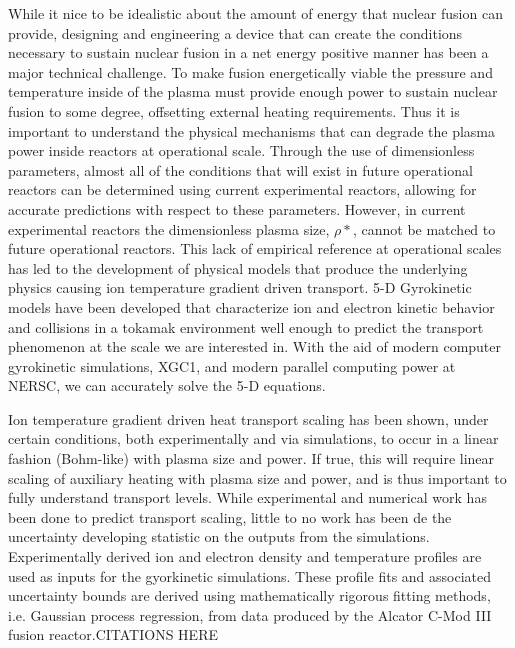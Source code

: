 \documentclass{article}
\begin{document}
While it nice to be idealistic about the amount of energy that nuclear fusion can provide, designing and engineering a device that can create the conditions necessary to sustain nuclear fusion in a net energy positive manner has been a major technical challenge. To make fusion energetically viable the pressure and temperature inside of the plasma must provide enough power to sustain nuclear fusion to some degree, offsetting external heating requirements. Thus it is important to understand the physical mechanisms that can degrade the plasma power inside reactors at operational scale. Through the use of dimensionless parameters, almost all of the conditions that will exist in future operational reactors can be determined using current experimental reactors, allowing for accurate predictions with respect to these parameters. However, in current experimental reactors the dimensionless plasma size, $\rho*$, cannot be matched to future operational reactors.  This lack of empirical reference at operational scales has led to the development of physical models that produce the underlying physics causing ion temperature gradient driven transport. 5-D Gyrokinetic models have been developed that characterize ion and electron kinetic behavior and collisions in a tokamak environment well enough to predict the transport phenomenon at the scale we are interested in. With the aid of modern computer gyrokinetic simulations, XGC1, and modern parallel computing power at NERSC, we can accurately solve the 5-D equations. \\

\vspace{0.01cm}

Ion temperature gradient driven heat transport scaling has been shown, under certain conditions, both experimentally and via simulations, to occur in a linear fashion (Bohm-like) with plasma size and power. If true, this will require linear scaling of auxiliary heating with plasma size and power, and is thus important to fully understand transport levels. While experimental and numerical work has been done to predict transport scaling, little to no work has been de the uncertainty developing statistic on the outputs from the simulations. Experimentally derived ion and electron density and temperature profiles are used as inputs for the gyorkinetic simulations. These profile fits and associated uncertainty bounds are derived using mathematically rigorous fitting methods, i.e. Gaussian process regression, from data produced by the Alcator C-Mod III fusion reactor.CITATIONS HERE\\
\end{document}
